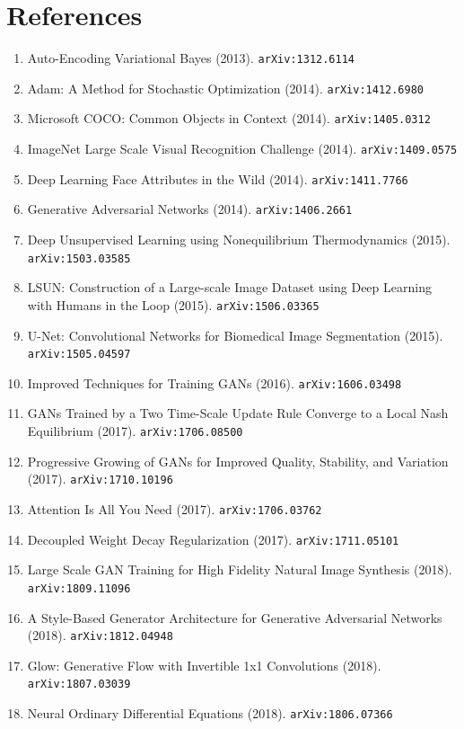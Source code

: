 \documentclass[11pt]{article}
\begin{document}
\section*{References}
\begin{enumerate}\small
  \item Auto-Encoding Variational Bayes (2013). \texttt{arXiv:1312.6114}
  \item Adam: A Method for Stochastic Optimization (2014). \texttt{arXiv:1412.6980}
  \item Microsoft COCO: Common Objects in Context (2014). \texttt{arXiv:1405.0312}
  \item ImageNet Large Scale Visual Recognition Challenge (2014). \texttt{arXiv:1409.0575}
  \item Deep Learning Face Attributes in the Wild (2014). \texttt{arXiv:1411.7766}
  \item Generative Adversarial Networks (2014). \texttt{arXiv:1406.2661}
  \item Deep Unsupervised Learning using Nonequilibrium Thermodynamics (2015). \texttt{arXiv:1503.03585}
  \item LSUN: Construction of a Large-scale Image Dataset using Deep Learning
  with Humans in the Loop (2015). \texttt{arXiv:1506.03365}
  \item U-Net: Convolutional Networks for Biomedical Image Segmentation (2015). \texttt{arXiv:1505.04597}
  \item Improved Techniques for Training GANs (2016). \texttt{arXiv:1606.03498}
  \item GANs Trained by a Two Time-Scale Update Rule Converge to a Local Nash
  Equilibrium (2017). \texttt{arXiv:1706.08500}
  \item Progressive Growing of GANs for Improved Quality, Stability, and
  Variation (2017). \texttt{arXiv:1710.10196}
  \item Attention Is All You Need (2017). \texttt{arXiv:1706.03762}
  \item Decoupled Weight Decay Regularization (2017). \texttt{arXiv:1711.05101}
  \item Large Scale GAN Training for High Fidelity Natural Image Synthesis (2018). \texttt{arXiv:1809.11096}
  \item A Style-Based Generator Architecture for Generative Adversarial Networks (2018). \texttt{arXiv:1812.04948}
  \item Glow: Generative Flow with Invertible 1x1 Convolutions (2018). \texttt{arXiv:1807.03039}
  \item Neural Ordinary Differential Equations (2018). \texttt{arXiv:1806.07366}

\end{enumerate}
\end{document}
